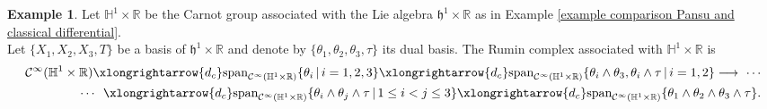\documentclass[dvipsnames]{amsart}
\theoremstyle{definition}
\newtheorem{example}[theorem]{Example}
\theoremstyle{definition}
\numberwithin{equation}{section}
\begin{document}
\begin{example}\label{example dc not commutes with Pansu pullback}
    Let $\mathbb{H}^1 \times \mathbb{R}$ be the Carnot group associated with the Lie algebra $\mathfrak{h}^1 \times \mathbb{R}$ as in Example \ref{example comparison Pansu and classical differential}.\\
    Let $\{X_1,X_2,X_3,T\}$ be a basis of  $\mathfrak{h}^1 \times \mathbb{R}$ and denote by $\{\theta_1, \theta_2, \theta_3, \tau\}$ its dual basis.
    The Rumin complex associated with $\mathbb{H}^1 \times \mathbb{R}$ is 
    \begin{align*}
        \mathcal{C}^{\infty}(\mathbb{H}^1 \times \mathbb{R}) \xlongrightarrow{d_c} \text{span}_{\mathcal{C}^{\infty}(\mathbb{H}^1 \times \mathbb{R})}\{\theta_i \,|\, i=1,2,3\} \xlongrightarrow{d_c} \text{span}_{\mathcal{C}^{\infty}(\mathbb{H}^1 \times \mathbb{R})}\{\theta_i \wedge\theta_3, \theta_i \wedge \tau\,|\,i=1,2\} \longrightarrow \,\, \cdots\\
        \cdots \,\,\, \xlongrightarrow{d_c} \text{span}_{\mathcal{C}^{\infty}(\mathbb{H}^1 \times \mathbb{R})}\{\theta_i\wedge \theta_j \wedge \tau\,|\,1\leq i <j\leq 3\} \xlongrightarrow{d_c} \text{span}_{\mathcal{C}^{\infty}(\mathbb{H}^1 \times \mathbb{R})}\{\theta_1 \wedge \theta_2 \wedge \theta_3 \wedge \tau\}.
    \end{align*}


\end{example}
\end{document}
